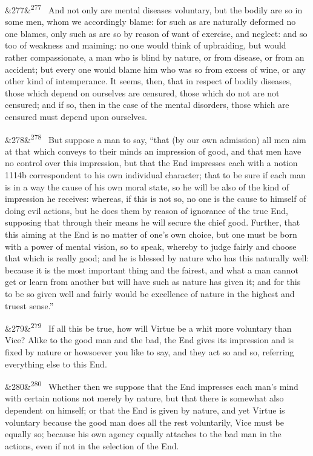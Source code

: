 \documentclass[12pt]{article}
\newcommand{\para}[1][]{\par\noindent\ifx&#1&\else\textsuperscript{\footnotesize #1}~\fi}
\begin{document}
\para[277] And not only are mental diseases voluntary, but the bodily are so in some men, whom we accordingly blame: for such as are naturally deformed no one blames, only such as are so by reason of want of exercise, and neglect: and so too of weakness and maiming: no one would think of upbraiding, but would rather compassionate, a man who is blind by nature, or from disease, or from an accident; but every one would blame him who was so from excess of wine, or any other kind of intemperance. It seems, then, that in respect of bodily diseases, those which depend on ourselves are censured, those which do not are not censured; and if so, then in the case of the mental disorders, those which are censured must depend upon ourselves.

\para[278] But suppose a man to say, “that (by our own admission) all men aim at that which conveys to their minds an impression of good, and that men have no control over this impression, but that the End impresses each with a notion 1114b correspondent to his own individual character; that to be sure if each man is in a way the cause of his own moral state, so he will be also of the kind of impression he receives: whereas, if this is not so, no one is the cause to himself of doing evil actions, but he does them by reason of ignorance of the true End, supposing that through their means he will secure the chief good. Further, that this aiming at the End is no matter of one's own choice, but one must be born with a power of mental vision, so to speak, whereby to judge fairly and choose that which is really good; and he is blessed by nature who has this naturally well: because it is the most important thing and the fairest, and what a man cannot get or learn from another but will have such as nature has given it; and for this to be so given well and fairly would be excellence of nature in the highest and truest sense.”

\para[279] If all this be true, how will Virtue be a whit more voluntary than Vice? Alike to the good man and the bad, the End gives its impression and is fixed by nature or howsoever you like to say, and they act so and so, referring everything else to this End.

\para[280] Whether then we suppose that the End impresses each man's mind with certain notions not merely by nature, but that there is somewhat also dependent on himself; or that the End is given by nature, and yet Virtue is voluntary because the good man does all the rest voluntarily, Vice must be equally so; because his own agency equally attaches to the bad man in the actions, even if not in the selection of the End.
\end{document}
